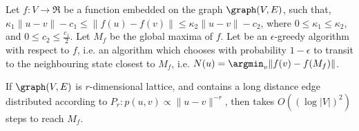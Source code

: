 \begin{theorem}
  \label{thm:sw}
  Let $f : V \to \Re$ be a function embedded on the graph $\graph(V,E)$,
  such that, $\kappa_1 \|u-v\| - c_1 \le \|f(u) - f(v)\| \le \kappa_2
  \|u - v\| - c_2$, where $0 \le \kappa_1 \le \kappa_2$, and $0 \le c_2
  \le \frac{c_1}{2}$. Let $M_f$ be the global maxima of $f$. Let
  \egreedyalgo be an $\epsilon$-greedy algorithm with respect to $f$,
  i.e.  an algorithm which chooses with probability $1-\epsilon$ to
  transit to the neighbouring state closest to $M_f$, i.e. $N(u)
  = \argmin_v \|f(v) - f(M_f)\|$.
  
  If $\graph(V,E)$ is $r$-dimensional lattice, and contains a long
  distance edge distributed according to $P_r: p(u,v) \propto
  \|u-v\|^{-r}$, then \egreedyalgo takes $O( (\log |V|)^2 )$ steps to
  reach $M_f$.
\end{theorem}
